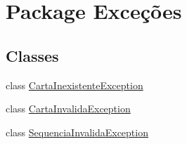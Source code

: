 \hypertarget{namespace_exce_xC3_xA7_xC3_xB5es}{
\section{Package Exceções}
\label{namespace_exce_xC3_xA7_xC3_xB5es}
}
\subsection*{Classes}
\begin{DoxyCompactItemize}
\item 
class \hyperlink{class_exce_xC3_xA7_xC3_xB5es_1_1_carta_inexistente_exception}{CartaInexistenteException}
\item 
class \hyperlink{class_exce_xC3_xA7_xC3_xB5es_1_1_carta_invalida_exception}{CartaInvalidaException}
\item 
class \hyperlink{class_exce_xC3_xA7_xC3_xB5es_1_1_sequencia_invalida_exception}{SequenciaInvalidaException}
\end{DoxyCompactItemize}
